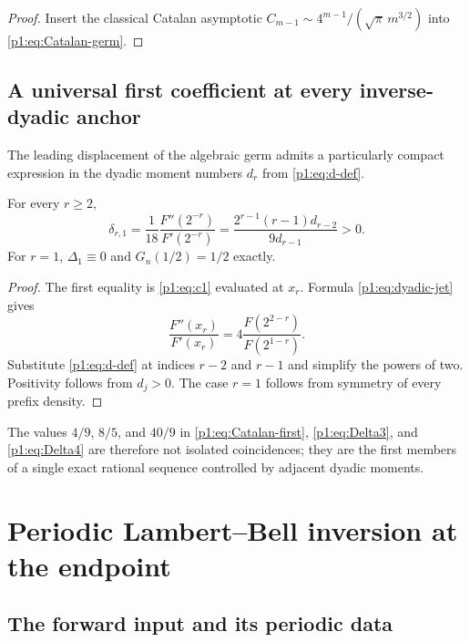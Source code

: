\documentclass[11pt,oneside]{article}
\numberwithin{equation}{section}
\theoremstyle{definition}
\theoremstyle{remark}
\begin{document}
\begin{proof}
Insert the classical Catalan asymptotic
$C_{m-1}\sim4^{m-1}/(\sqrt\pi\,m^{3/2})$ into
\eqref{p1:eq:Catalan-germ}.
\end{proof}

\subsection{A universal first coefficient at every inverse-dyadic anchor}

The leading displacement of the algebraic germ admits a particularly compact expression in
the dyadic moment numbers $d_r$ from \eqref{p1:eq:d-def}.

\begin{proposition}
\label{p1:prop:first-dyadic-germ-coefficient}
For every $r\ge2$,
\begin{equation}
 \boxed{
 \delta_{r,1}
 =\frac1{18}\frac{F''(2^{-r})}{F'(2^{-r})}
 =\frac{2^{r-1}(r-1)d_{r-2}}{9d_{r-1}}>0.}
 \label{p1:eq:first-dyadic-germ-coefficient}
\end{equation}
For $r=1$, $\Delta_1\equiv0$ and $G_n(1/2)=1/2$ exactly.
\end{proposition}

\begin{proof}
The first equality is \eqref{p1:eq:c1} evaluated at $x_r$.  Formula
\eqref{p1:eq:dyadic-jet} gives
\[
 \frac{F''(x_r)}{F'(x_r)}
 =4\frac{F(2^{2-r})}{F(2^{1-r})}.
\]
Substitute \eqref{p1:eq:d-def} at indices $r-2$ and $r-1$ and simplify the powers
of two.  Positivity follows from $d_j>0$.  The case $r=1$ follows from symmetry
of every prefix density.
\end{proof}

The values $4/9$, $8/5$, and $40/9$ in
\eqref{p1:eq:Catalan-first}, \eqref{p1:eq:Delta3}, and \eqref{p1:eq:Delta4} are therefore
not isolated coincidences; they are the first members of a single exact rational
sequence controlled by adjacent dyadic moments.

\section{Periodic Lambert--Bell inversion at the endpoint}
\label{p1:sec:endpoint-inversion}

\subsection{The forward input and its periodic data}
\end{document}
